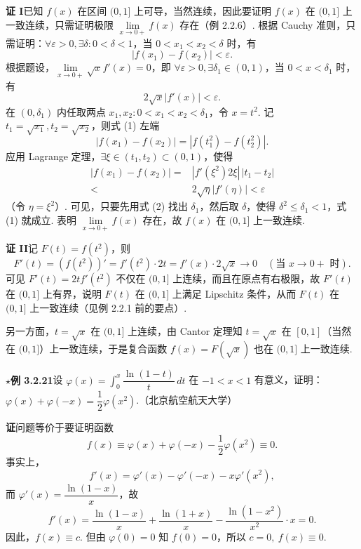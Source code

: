 \documentclass[UTF8, 12pt, fontset=fandol, oneside]{ctexart}
\begin{document}
\noindent\textbf{证 I}\quad 已知 $f(x)$ 在区间 $(0,1]$ 上可导，当然连续，因此要证明 $f(x)$ 在 $(0,1]$ 上一致连续，只需证明极限 $\lim\limits_{x\to0+}f(x)$ 存在（例 2.2.6）. 根据 Cauchy 准则，只需证明：$\forall\varepsilon>0,\exists\delta:0<\delta<1$，当 $0<x_1<x_2<\delta$ 时，有
\begin{equation}
  |f(x_1)-f(x_2)|<\varepsilon.
\tag{1}
\end{equation}
根据题设，$\lim\limits_{x\to0+}\sqrt{x}f'(x)=0$，即 $\forall\varepsilon>0,\exists\delta_1\in(0,1)$，当 $0<x<\delta_1$ 时，有
\begin{equation}
  2\sqrt{x}|f'(x)|<\varepsilon.
\tag{2}
\end{equation}
在 $(0,\delta_1)$ 内任取两点 $x_1,x_2:0<x_1<x_2<\delta_1$，令 $x=t^2$. 记 $t_1=\sqrt{x_1},t_2=\sqrt{x_2}$，则式 (1) 左端
\begin{equation}
  |f(x_1)-f(x_2)|=|f(t_1^2)-f(t_2^2)|.
\tag{3}
\end{equation}
应用 Lagrange 定理，$\exists\xi\in(t_1,t_2)\subset(0,1)$，使得
\begin{equation}
\begin{aligned}
|f(x_1)-f(x_2)|
={}& |f'(\xi^2)2\xi|\,|t_1-t_2|\\
<{}& 2\sqrt{\eta}|f'(\eta)|<\varepsilon
\end{aligned}
\tag{4}
\end{equation}
（令 $\eta=\xi^2$）.
可见，只要先用式 (2) 找出 $\delta_1$，然后取 $\delta$，使得 $\delta^2\le\delta_1<1$，式 (1) 就成立. 表明 $\lim\limits_{x\to0+}f(x)$ 存在，故 $f(x)$ 在 $(0,1]$ 上一致连续.

\noindent\textbf{证 II}\quad 记 $F(t)=f(t^2)$，则
\[
  F'(t)=(f(t^2))'=f'(t^2)\cdot2t=f'(x)\cdot2\sqrt{x}\to0\quad(\text{当 }x\to0+\text{ 时}).
\]
可见 $F'(t)=2tf'(t^2)$ 不仅在 $(0,1]$ 上连续，而且在原点有右极限，故 $F'(t)$ 在 $(0,1]$ 上有界，说明 $F(t)$ 在 $(0,1]$ 上满足 Lipschitz 条件，从而 $F(t)$ 在 $(0,1]$ 上一致连续（见例 2.2.1 前的要点）.

另一方面，$t=\sqrt{x}$ 在 $(0,1]$ 上连续，由 Cantor 定理知 $t=\sqrt{x}$ 在 $[0,1]$（当然在 $(0,1]$）上一致连续，于是复合函数 $f(x)=F(\sqrt{x})$ 也在 $(0,1]$ 上一致连续.

\noindent\textbf{$\star$例 3.2.21}\quad 设 $\varphi(x)=\int_0^x\dfrac{\ln(1-t)}t\,dt$ 在 $-1<x<1$ 有意义，证明：$\varphi(x)+\varphi(-x)=\dfrac12\varphi(x^2)$.（北京航空航天大学）

\noindent\textbf{证}\quad 问题等价于要证明函数
\[
  f(x)\equiv\varphi(x)+\varphi(-x)-\frac12\varphi(x^2)\equiv0.
\]
事实上，
\[
  f'(x)=\varphi'(x)-\varphi'(-x)-x\varphi'(x^2),
\]
而 $\varphi'(x)=\dfrac{\ln(1-x)}x$，故
\[
  f'(x)=\frac{\ln(1-x)}x+\frac{\ln(1+x)}x-\frac{\ln(1-x^2)}{x^2}\cdot x=0.
\]
因此，$f(x)\equiv c$. 但由 $\varphi(0)=0$ 知 $f(0)=0$，所以 $c=0,\ f(x)\equiv0$.
\end{document}
